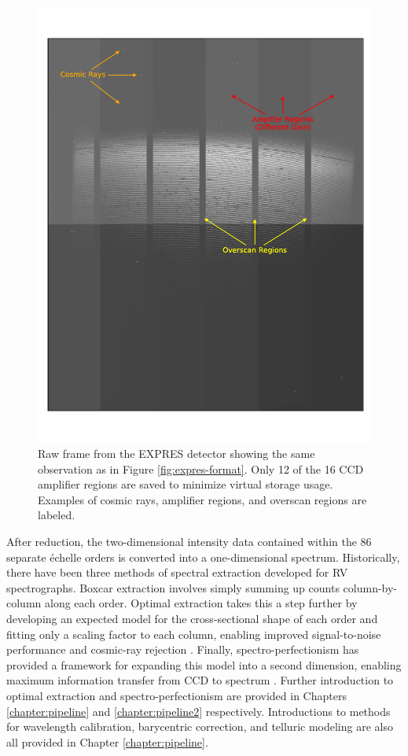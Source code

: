 \begin{figure}
    \centering
    \includegraphics[width=\textwidth]{figures-1/expres-raw.pdf}
    \caption[EXPRES Raw CCD Frame]{Raw frame from the EXPRES detector showing the same observation as in Figure \ref{fig:expres-format}. Only 12 of the 16 CCD amplifier regions are saved to minimize virtual storage usage. Examples of cosmic rays, amplifier regions, and overscan regions are labeled.}
    \label{fig:expres-raw}
\end{figure}

After reduction, the two-dimensional intensity data contained within the 86 separate \'echelle orders is converted into a one-dimensional spectrum. Historically, there have been three methods of spectral extraction developed for RV spectrographs. Boxcar extraction involves simply summing up counts column-by-column along each order. Optimal extraction takes this a step further by developing an expected model for the cross-sectional shape of each order and fitting only a scaling factor to each column, enabling improved signal-to-noise performance and cosmic-ray rejection \citep{horne_optimal_1986}. Finally, spectro-perfectionism has provided a framework for expanding this model into a second dimension, enabling maximum information transfer from CCD to spectrum \citep{bolton_spectro-perfectionism_2009}. Further introduction to optimal extraction and spectro-perfectionism are provided in Chapters \ref{chapter:pipeline} and \ref{chapter:pipeline2} respectively. Introductions to methods for wavelength calibration, barycentric correction, and telluric modeling are also all provided in Chapter \ref{chapter:pipeline}.

